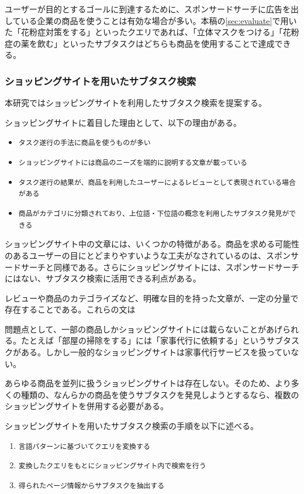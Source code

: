 \documentclass[submit,techreq]{ipsj}
\def\|{\verb|}
\begin{document}
ユーザーが目的とするゴールに到達するために、スポンサードサーチに広告を出している企業の商品を使うことは有効な場合が多い。本稿の\ref{sec:evaluate}で用いた「花粉症対策をする」といったクエリであれば、「立体マスクをつける」「花粉症の薬を飲む」といったサブタスクはどちらも商品を使用することで達成できる。

%4.2.2
\subsubsection{ショッピングサイトを用いたサブタスク検索}
本研究ではショッピングサイトを利用したサブタスク検索を提案する。

ショッピングサイトに着目した理由として、以下の理由がある。

\begin{itemize}
\item \|タスク遂行の手法に商品を使うものが多い|
\item \|ショッピングサイトには商品のニーズを端的に説明する文章が載っている|
\item \|タスク遂行の結果が、商品を利用したユーザーによるレビューとして表現されている場合がある|
\item \|商品がカテゴリに分類されており、上位語・下位語の概念を利用したサブタスク発見ができる|
\end{itemize}


ショッピングサイト中の文章には、いくつかの特徴がある。商品を求める可能性のあるユーザーの目にとどまりやすいような工夫がなされているのは、スポンサードサーチと同様である。さらにショッピングサイトには、スポンサードサーチにはない、サブタスク検索に活用できる利点がある。

レビューや商品のカテゴライズなど、明確な目的を持った文章が、一定の分量で存在することである。これらの文は


問題点として、一部の商品しかショッピングサイトには載らないことがあげられる。たとえば「部屋の掃除をする」には「家事代行に依頼する」というサブタスクがある。しかし一般的なショッピングサイトは家事代行サービスを扱っていない。

あらゆる商品を並列に扱うショッピングサイトは存在しない。そのため、より多くの種類の、なんらかの商品を使うサブタスクを発見しようとするなら、複数のショッピングサイトを併用する必要がある。

ショッピングサイトを用いたサブタスク検索の手順を以下に述べる。

\begin{enumerate}
\item \|言語パターンに基づいてクエリを変換する|
\item \|変換したクエリをもとにショッピングサイト内で検索を行う|
\item \|得られたページ情報からサブタスクを抽出する|
\end{enumerate}
\end{document}
